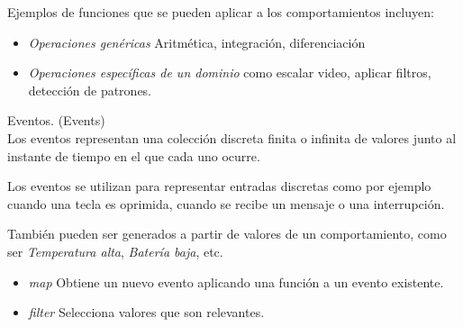   Ejemplos de funciones que se pueden aplicar a los
comportamientos incluyen:

\begin{itemize}
\item \textit{Operaciones genéricas} Aritmética, integración, diferenciación
\item {
    \textit{Operaciones específicas de un dominio} como escalar video,
    aplicar filtros, detección de patrones.
}
\end{itemize}


\begin{definicion}
  Eventos. (Events)\\

  Los eventos representan una colección discreta finita o infinita de valores
  junto al instante de tiempo en el que cada uno ocurre.


\end{definicion}

  Los eventos se utilizan para representar entradas discretas como por
ejemplo cuando una tecla es oprimida, cuando se recibe un
mensaje o una interrupción.

  También pueden ser generados a partir de valores de un comportamiento,
como ser \emph{Temperatura alta}, \emph{Batería baja}, etc.

\begin{itemize}
  \item {
      \textit{map} Obtiene un nuevo evento aplicando una función
                   a un evento existente.
  }
  \item {
      \textit{filter} Selecciona valores que son relevantes.
  }
\end{itemize}



